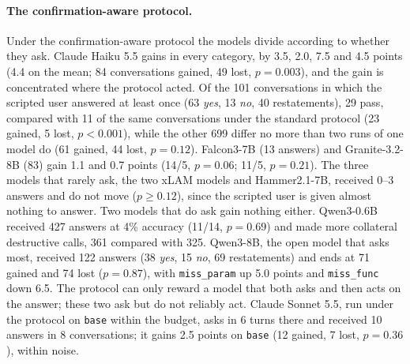 \documentclass{article}
\newcommand{\cls}[1]{\texttt{#1}}
\newcommand{\Sclean}{SFT\textsubscript{clean}}
\newcommand{\Snear}{SFT\textsubscript{near-miss}}
\begin{document}
\paragraph{The confirmation-aware protocol.} Under the confirmation-aware protocol the models divide according to
whether they ask. Claude Haiku 5.5 gains in every category, by 3.5, 2.0, 7.5 and 4.5 points (4.4 on the mean; 84
conversations gained, 49 lost, $p=0.003$), and the gain is concentrated where the protocol acted. Of the 101
conversations in which the scripted user answered at least once (63 \emph{yes}, 13 \emph{no}, 40 restatements), 29 pass,
compared with 11 of the same conversations under the standard protocol (23 gained, 5 lost, $p<0.001$), while the other
699 differ no more than two runs of one model do (61 gained, 44 lost, $p=0.12$). Falcon3-7B (13 answers) and
Granite-3.2-8B (83) gain 1.1 and 0.7 points (14/5, $p=0.06$; 11/5, $p=0.21$).
The three models that rarely ask, the two xLAM models and Hammer2.1-7B, received 0--3 answers and do not move
($p\ge0.12$), since the scripted user is given almost nothing to answer. Two models that do ask gain nothing either.
Qwen3-0.6B received 427 answers at 4\% accuracy (11/14, $p=0.69$) and made more collateral destructive calls, 361
compared with 325. Qwen3-8B, the open model that asks most, received 122 answers (38 \emph{yes}, 15 \emph{no}, 69
restatements) and ends at 71 gained and 74 lost ($p=0.87$), with \cls{miss\_param} up 5.0 points and \cls{miss\_func}
down 6.5. The protocol can only reward a model that both asks and then acts on the answer; these two ask but do not
reliably act. Claude Sonnet 5.5, run under the protocol on \cls{base} within the budget, asks in 6 turns there and
received 10 answers in 8 conversations; it gains 2.5 points on \cls{base} (12 gained, 7 lost, $p=0.36$), within noise.
\end{document}
